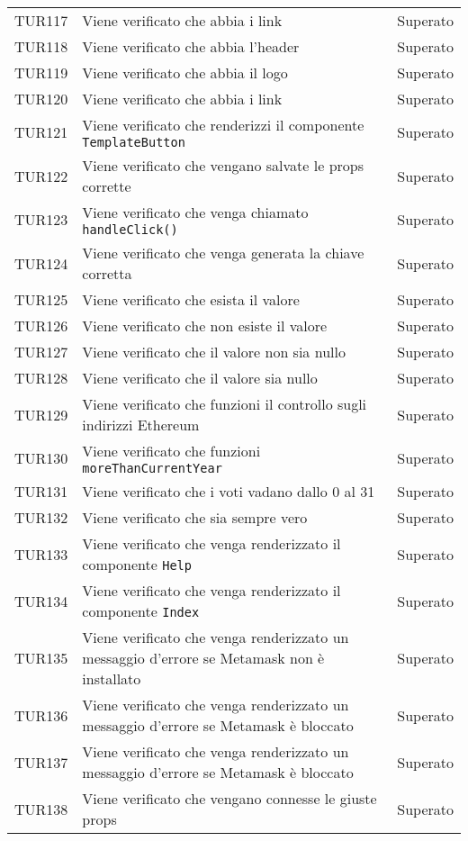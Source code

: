 \documentclass[PianoDiQualifica.tex]{subfiles}
\begin{document}
\begin{longtable}[H]{P{2cm}P{8.5cm}P{3cm}}
	TUR117 & Viene verificato che abbia i link & Superato \\ 
	TUR118 & Viene verificato che abbia l'header & Superato \\ 
	TUR119 & Viene verificato che abbia il logo & Superato \\ 
	TUR120 & Viene verificato che abbia i link & Superato \\ 
	TUR121 & Viene verificato che renderizzi il componente \texttt{TemplateButton} & Superato \\ 
	TUR122 & Viene verificato che vengano salvate le props corrette & Superato \\ 
	TUR123 & Viene verificato che venga chiamato \texttt{handleClick()} & Superato \\ 
	TUR124 & Viene verificato che venga generata la chiave corretta & Superato \\ 
	TUR125 & Viene verificato che esista il valore & Superato \\ 
	TUR126 & Viene verificato che non esiste il valore & Superato \\ 
	TUR127 & Viene verificato che il valore non sia nullo & Superato \\ 
	TUR128 & Viene verificato che il valore sia nullo & Superato \\ 
	TUR129 & Viene verificato che funzioni il controllo sugli indirizzi Ethereum & Superato \\ 
	TUR130 & Viene verificato che funzioni \texttt{moreThanCurrentYear} & Superato \\ 
	TUR131 & Viene verificato che i voti vadano dallo 0 al 31 & Superato \\ 
	TUR132 & Viene verificato che sia sempre vero & Superato \\ 
	TUR133 & Viene verificato che venga renderizzato il componente \texttt{Help} & Superato \\ 
	TUR134 & Viene verificato che venga renderizzato il componente \texttt{Index}& Superato \\ 
	TUR135 & Viene verificato che venga renderizzato un messaggio d'errore se Metamask non è installato & Superato \\ 
	TUR136 & Viene verificato che venga renderizzato un messaggio d'errore se Metamask è bloccato & Superato \\ 
	TUR137 & Viene verificato che venga renderizzato un messaggio d'errore se Metamask è bloccato & Superato \\ 
	TUR138 & Viene verificato che vengano connesse le giuste props & Superato \\ 

\end{longtable}
\end{document}
